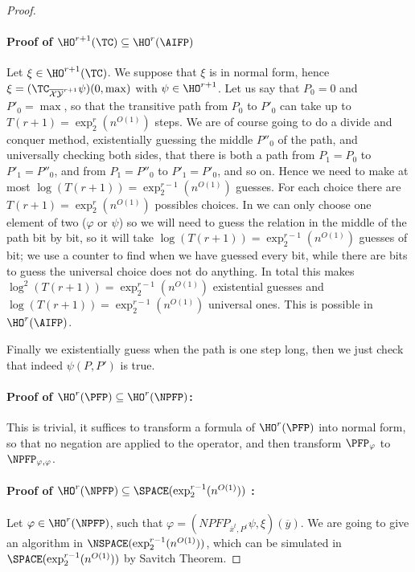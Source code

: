 \documentclass[a4paper,12pt]{article}
\theoremstyle{definition}
\renewcommand{\phi}{\varphi}
\newcommand{\hoa}[1]{\ensuremath{\HO^{#1}}}
\newcommand{\ex}[1]{\ensuremath{\exp_{2}^{#1}(n^{O(1)})}}
\newcommand{\ol}{\overline}
\newcommand{\olmc}[1]{\overline{\mathcal{#1}}}
\begin{document}
\begin{proof}
\paragraph{Proof of $\hoa {r+1}(\TC)\subseteq\hoa r(\AIFP)$}
Let $\xi\in\hoa{r+1}(\TC)$. We suppose that $\xi$ is in normal form,
hence $\xi=(\TC_{\olmc {XY}^{r+1}}\psi)(0,\max)$ with
$\psi\in\hoa{r+1}$. Let us say that $P_{0}=0$ and $P'_{0}=\max$, so that the
transitive path from $P_{0}$ to $P'_{0}$ can take up to $T(r+1)=\ex r$
steps. We are of course going to do a divide and conquer method,
existentially guessing the middle $P''_{0}$ of the path, and
universally checking both sides, that there is both a path from
$P_{1}=P_{0}$ to $P'_{1}=P''_{0}$, and from $P_{1}=P''_{0}$ to
$P'_{1}=P'_{0}$, and so on.  Hence we need to make at most
$\log(T(r+1))=\ex {r-1}$ guesses. For each choice there are
$T(r+1)=\ex r$ possibles choices. In \AIFP{} we can only choose one
element of two ($\phi$ or $\psi$) so we will need to guess the
relation in the middle of the path bit by bit, so it will take
$\log(T(r+1))=\ex {r-1}$ guesses of bit; we use a counter to find when
we have guessed every bit, while there are bits to guess the universal
choice does not do anything. In total this makes
$\log^{2}(T(r+1))=\ex {r-1}$ existential guesses and $\log(T(r+1))=\ex
{r-1}$ universal ones. This is possible in $\hoa r(\AIFP)$.

Finally we existentially guess when the path is one step long, then we
just check that indeed $\psi(P,P')$ is true.
\paragraph{Proof of $\hoa{r}(\PFP)\subseteq\hoa{r}(\NPFP)$:} This is trivial,
it suffices to transform a formula of $\hoa r(\PFP)$ into normal form,
so that no negation are applied to the operator, and then transform
$\PFP_{\phi}$ to $\NPFP_{\phi,\phi}$.

\paragraph{Proof of $\hoa{r}(\NPFP)\subseteq\SPACE(\exp_{2}^{r-1}(n^{O(1)}))$ :}
Let $\phi\in\hoa{r}(\NPFP)$, such that $\phi=(NPFP_{\ol
  x^{t},P^{t}}\psi,\xi)(\ol y)$. We are going to give an algorithm in
$\NSPACE(\exp_{2}^{r-1}(n^{O(1)}))$, which can be simulated in
$\SPACE(\exp_{2}^{r-1}(n^{O(1)}))$ by Savitch Theorem.


\end{proof}
\end{document}
